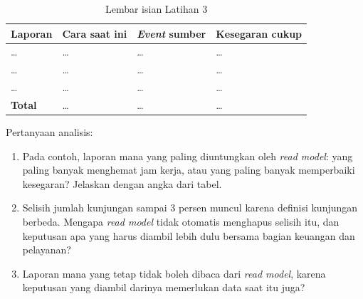 \begin{table}[!htb]
  \centering
  \caption{Lembar isian Latihan 3}
  \label{tab:ch10-lat3-hasil}
  \footnotesize
  \begin{tabularx}{\textwidth}{>{\raggedright\arraybackslash}p{2.2cm} >{\raggedright\arraybackslash}X >{\raggedright\arraybackslash}p{3.1cm} >{\raggedright\arraybackslash}p{1.8cm}}
    \hline
    \textbf{Laporan} & \textbf{Cara saat ini} & \textbf{\textit{Event} sumber} &
      \textbf{Kesegaran cukup} \\ \hline
    \dots & \dots & \dots & \dots \\ \hline
    \dots & \dots & \dots & \dots \\ \hline
    \dots & \dots & \dots & \dots \\ \hline
    \textbf{Total} & \dots & \dots & \dots \\ \hline
  \end{tabularx}
\end{table}

Pertanyaan analisis:
\begin{enumerate}
  \item Pada contoh, laporan mana yang paling diuntungkan oleh \textit{read model}: yang paling
        banyak menghemat jam kerja, atau yang paling banyak memperbaiki kesegaran? Jelaskan dengan
        angka dari tabel.
  \item Selisih jumlah kunjungan sampai 3 persen muncul karena definisi kunjungan berbeda. Mengapa
        \textit{read model} tidak otomatis menghapus selisih itu, dan keputusan apa yang harus
        diambil lebih dulu bersama bagian keuangan dan pelayanan?
  \item Laporan mana yang tetap tidak boleh dibaca dari \textit{read model}, karena keputusan yang
        diambil darinya memerlukan data saat itu juga?
\end{enumerate}
